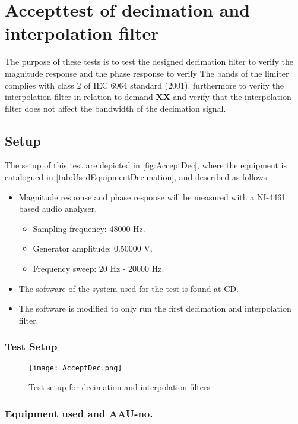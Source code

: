 \chapter{Accepttest of decimation and interpolation filter}\label{app:journal_decimationFilter}
The purpose of these tests is to test the designed decimation filter to verify the magnitude response and the phase response to verify The bands of the limiter complies with class 2 of IEC 6964 standard (2001). furthermore to verify the interpolation filter in relation to demand \textbf{XX} and verify that the interpolation filter does not affect the bandwidth of the decimation signal.





\section{Setup}
The setup of this test are depicted in \autoref{fig:AcceptDec}, where the equipment is catalogued in \autoref{tab:UsedEquipmentDecimation}, and described as follows:

\begin{itemize}
\item Magnitude response and phase response will be measured with a NI-4461 based audio analyser. 
\begin{itemize}
\item Sampling frequency: 48000 Hz.
\item Generator amplitude: 0.50000 V.
\item Frequency sweep: 20 Hz - 20000 Hz.
\end{itemize}
\item The software of the system used for the test is found at CD. 
\item The software is modified to only run the first decimation and interpolation filter.
\end{itemize}


\subsection*{Test Setup}
\begin{figure}[H]
\centering
\texttt{[image: AcceptDec.png]}
\caption{Test setup for decimation and interpolation filters}
\label{fig:AcceptDec}
\end{figure}

\subsection*{Equipment used and AAU-no.}


